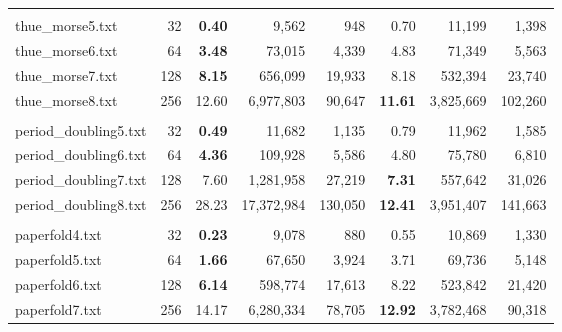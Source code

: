 \documentclass[11pt]{article}
\begin{document}
\begin{table}
\begin{tabular}{lrrrrrrr}
    \multicolumn{8}{l}{} \\
    thue\_morse5.txt & 32 & \textbf{0.40} & 9,562 & 948 & 0.70 & 11,199 & 1,398  \\
    thue\_morse6.txt & 64 & \textbf{3.48} & 73,015 & 4,339 & 4.83 & 71,349 & 5,563  \\
    thue\_morse7.txt & 128 & \textbf{8.15} & 656,099 & 19,933 & 8.18 & 532,394 & 23,740  \\
    thue\_morse8.txt & 256 & 12.60 & 6,977,803 & 90,647 & \textbf{11.61} & 3,825,669 & 102,260  \\
    \multicolumn{8}{l}{} \\
    period\_doubling5.txt & 32 & \textbf{0.49} & 11,682 & 1,135 & 0.79 & 11,962 & 1,585  \\
    period\_doubling6.txt & 64 & \textbf{4.36} & 109,928 & 5,586 & 4.80 & 75,780 & 6,810  \\
    period\_doubling7.txt & 128 & 7.60 & 1,281,958 & 27,219 & \textbf{7.31} & 557,642 & 31,026  \\
    period\_doubling8.txt & 256 & 28.23 & 17,372,984 & 130,050 & \textbf{12.41} & 3,951,407 & 141,663  \\
    \multicolumn{8}{l}{} \\
    paperfold4.txt & 32 & \textbf{0.23} & 9,078 & 880 & 0.55 & 10,869 & 1,330  \\
    paperfold5.txt & 64 & \textbf{1.66} & 67,650 & 3,924 & 3.71 & 69,736 & 5,148  \\
    paperfold6.txt & 128 & \textbf{6.14} & 598,774 & 17,613 & 8.22 & 523,842 & 21,420  \\
    paperfold7.txt & 256 & 14.17 & 6,280,334 & 78,705 & \textbf{12.92} & 3,782,468 & 90,318  \\
    \bottomrule
  \end{tabular}
  \label{tab:encoding-comparison}
\end{table}
\end{document}
